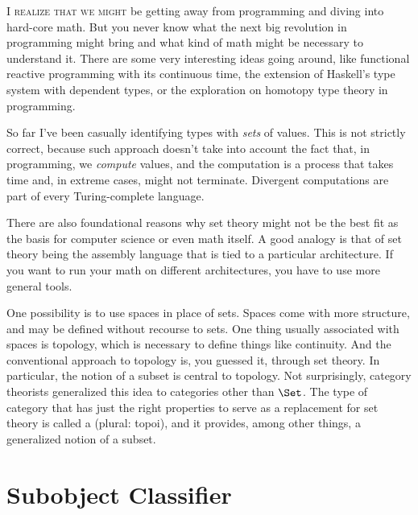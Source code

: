 \lettrine[lhang=0.17]{I}{ realize that we might} be getting away from programming and diving into
hard-core math. But you never know what the next big revolution in
programming might bring and what kind of math might be necessary to
understand it. There are some very interesting ideas going around, like
functional reactive programming with its continuous time, the extension
of Haskell's type system with dependent types, or the exploration on
homotopy type theory in programming.

So far I've been casually identifying types with \emph{sets} of values.
This is not strictly correct, because such approach doesn't take into
account the fact that, in programming, we \emph{compute} values, and the
computation is a process that takes time and, in extreme cases, might
not terminate. Divergent computations are part of every Turing-complete
language.

There are also foundational reasons why set theory might not be the best
fit as the basis for computer science or even math itself. A good
analogy is that of set theory being the assembly language that is tied
to a particular architecture. If you want to run your math on different
architectures, you have to use more general tools.

One possibility is to use spaces in place of sets. Spaces come with more
structure, and may be defined without recourse to sets. One thing
usually associated with spaces is topology, which is necessary to define
things like continuity. And the conventional approach to topology is,
you guessed it, through set theory. In particular, the notion of a
subset is central to topology. Not surprisingly, category theorists
generalized this idea to categories other than $\Set$. The type of
category that has just the right properties to serve as a replacement
for set theory is called a  (plural: topoi), and it
provides, among other things, a generalized notion of a subset.

\section{Subobject Classifier}

